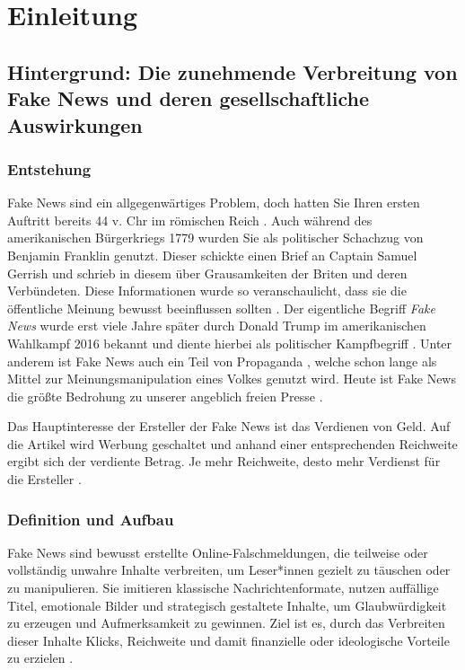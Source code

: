 \chapter{Einleitung}
\label{chap:einleitung}

\section{Hintergrund: Die zunehmende Verbreitung von Fake News und deren gesellschaftliche Auswirkungen}
\label{sec:hintergrund}


\subsection{Entstehung}

Fake News sind ein allgegenwärtiges Problem, doch hatten Sie Ihren ersten Auftritt bereits 44 v. Chr im römischen Reich \cite{socsci9100185}.
Auch während des amerikanischen Bürgerkriegs 1779 wurden Sie als politischer Schachzug von Benjamin Franklin genutzt.
Dieser schickte einen Brief an Captain Samuel Gerrish und schrieb in diesem über Grausamkeiten der Briten und deren Verbündeten. 
Diese Informationen wurde so veranschaulicht, dass sie die öffentliche Meinung bewusst beeinflussen sollten \cite{Sharma:2024}.
Der eigentliche Begriff \textit{Fake News} wurde erst viele Jahre später durch Donald Trump im amerikanischen Wahlkampf 2016 bekannt \cite{Ashish2024} 
und diente hierbei als politischer Kampfbegriff \cite{buerker2022fakenews}.
Unter anderem ist Fake News auch ein Teil von Propaganda \cite{buerker2022fakenews}, welche schon lange als Mittel zur Meinungsmanipulation eines Volkes genutzt wird.
Heute ist Fake News die größte Bedrohung zu unserer angeblich freien Presse \cite{Sharma:2024}.

Das Hauptinteresse der Ersteller der Fake News ist das Verdienen von Geld. Auf die Artikel wird Werbung geschaltet und 
anhand einer entsprechenden Reichweite ergibt sich der verdiente Betrag. Je mehr Reichweite, desto mehr Verdienst für die Ersteller \cite{socsci9100185}.

\subsection{Definition und Aufbau}
\label{sec:wie_definieren_sich_fake_news}

Fake News sind bewusst erstellte Online-Falschmeldungen, die teilweise oder vollständig unwahre Inhalte verbreiten, 
um Leser*innen gezielt zu täuschen oder zu manipulieren. Sie imitieren klassische Nachrichtenformate, nutzen auffällige Titel, emotionale Bilder und strategisch gestaltete
Inhalte, um Glaubwürdigkeit zu erzeugen und Aufmerksamkeit zu gewinnen. Ziel ist es, durch das Verbreiten dieser Inhalte Klicks, Reichweite und damit finanzielle oder ideologische Vorteile zu
erzielen \cite{socsci9100185}.

